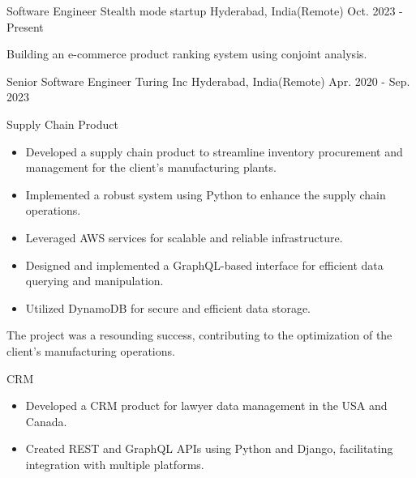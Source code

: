 

\begin{cventries}

  \cventry
  {Software Engineer} %
  {Stealth mode startup} %
  {Hyderabad, India(Remote)} %
  {Oct. 2023 - Present} %
  {
    \begin{cvitems} %
      \item {Building an e-commerce product ranking system using conjoint analysis.}
    \end{cvitems}
  }
  \cventry
    {Senior Software Engineer} %
    {Turing Inc} %
    {Hyderabad, India(Remote)} %
    {Apr. 2020 - Sep. 2023} %
    {
      \begin{cvitems} %
        \item {Supply Chain Product}
        \begin {itemize}
          \item Developed a supply chain product to streamline inventory procurement and management for the client's manufacturing plants.
          \item Implemented a robust system using Python to enhance the supply chain operations.
          \item Leveraged AWS services for scalable and reliable infrastructure.
          \item Designed and implemented a GraphQL-based interface for efficient data querying and manipulation.
          \item Utilized DynamoDB for secure and efficient data storage.
          \end{itemize}
        The project was a resounding success, contributing to the optimization of the client's manufacturing operations.
	\item {CRM}
      \begin {itemize}
        \item Developed a CRM product for lawyer data management in the USA and Canada.
        \item Created REST and GraphQL APIs using Python and Django, facilitating integration with multiple platforms.

\end{itemize}
\end{cvitems}}
\end{cventries}
